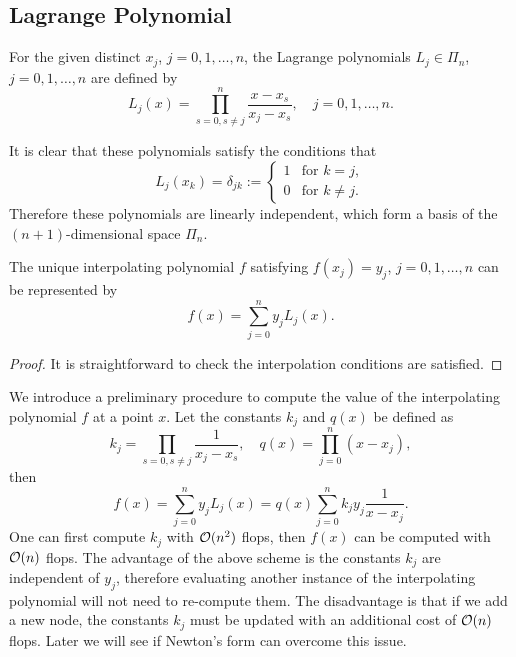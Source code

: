 \subsection{Lagrange Polynomial}
\begin{definition}
    For the given distinct $x_j$, $j = 0, 1, \dots, n$, the Lagrange polynomials $L_j\in\Pi_n$, $j=0,1,\dots, n$ are defined by 
    \begin{equation}
        L_j(x) = \prod_{s = 0, s\neq j}^n \frac{x - x_s}{x_j - x_s}, \quad j = 0, 1,\dots , n.
    \end{equation}
\end{definition}
It is clear that these polynomials satisfy the conditions that 
\begin{equation}
    L_j(x_k) = \delta_{jk} := \begin{cases}
        1&\text{for } k=j,\\
        0&\text{for } k\neq j.
    \end{cases}
\end{equation}
Therefore these polynomials are linearly independent, which form a basis of the $(n+ 1)$-dimensional space $\Pi_n$.
\begin{theorem}
\label{Thm: 2-Uni-Exi-Lag}
    The unique interpolating polynomial $f$ satisfying $f(x_j) = y_j$, $j=0,1,\dots, n$ can be represented by 
    \begin{equation}
        f(x) = \sum_{j=0}^n y_j L_j(x).
    \end{equation}
\end{theorem}
\begin{proof}
    It is straightforward to check the interpolation conditions are satisfied.
\end{proof}
\begin{remark}
    We introduce a preliminary procedure to compute the value of the interpolating polynomial $f$ at a point $x$. Let the constants $k_j$ and $q(x)$ be defined as 
    \begin{equation}
        k_j = \prod_{s= 0, s\neq j}\frac{1}{x_j - x_s},\quad q(x) = \prod_{j=0}^n (x - x_j),
    \end{equation}
    then 
    \begin{equation}
        f(x) = \sum_{j=0}^n y_j L_j(x) = q(x)  \sum_{j=0}^n k_j y_j \frac{1}{x - x_j}.
    \end{equation}
    One can first compute $k_j$ with $\mathcal O(n^2)$ flops, then $f(x)$ can be computed with $\mathcal O(n)$ flops. The advantage of the above scheme is the constants $k_j$ are independent of $y_j$, therefore evaluating another instance of the interpolating polynomial will not need to re-compute them. The disadvantage is that if we add a new node, the constants $k_j$ must be updated with an additional cost of $\mathcal O(n)$ flops. Later we will see if Newton's form can overcome this issue.
\end{remark}
